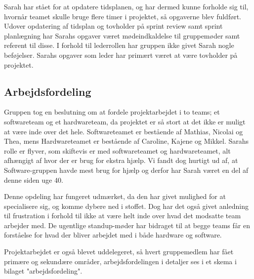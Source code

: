 Sarah har stået for at opdatere tidsplanen, og har dermed kunne forholde sig til, hvornår teamet skulle bruge flere timer i projektet, så opgaverne blev fuldført. Udover opdatering af tidsplan og tovholder på sprint review samt sprint planlægning har Sarahs opgaver været mødeindkaldelse til gruppemøder samt referent til disse. I forhold til lederrollen har gruppen ikke givet Sarah nogle beføjelser. Sarahs opgaver som leder har primært været at være tovholder på projektet. 

\subsection{Arbejdsfordeling}
Gruppen tog en beslutning om at fordele projektarbejdet i to teams; et softwareteam og et hardwareteam, da projektet er så stort at det ikke er muligt at være inde over det hele. Softwareteamet er bestående af Mathias, Nicolai og Thea, mens Hardwareteamet er bestående af Caroline, Kajene og Mikkel. Sarahs rolle er flyver, som skiftevis er med softwareteamet og hardwareteamet, alt afhængigt af hvor der er brug for ekstra hjælp. Vi fandt dog hurtigt ud af, at Software-gruppen havde mest brug for hjælp og derfor har Sarah været en del af denne siden uge 40.

Denne opdeling har fungeret udmærket, da den har givet mulighed for at specialisere sig, og komme dybere ned i stoffet. Dog har det også givet anledning til frustration i forhold til ikke at være helt inde over hvad det modsatte team arbejder med. De ugentlige standup-møder har bidraget til at begge teams får en forståelse for hvad der bliver arbejdet med i både hardware og software.

Projektarbejdet er også blevet uddelegeret, så hvert gruppemedlem har fået primære og sekundære områder, arbejdsfordelingen i detaljer ses i et skema i bilaget "arbejdsfordeling".

















